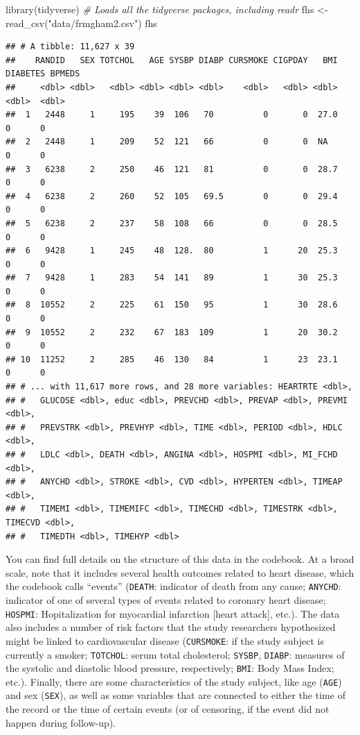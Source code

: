 \documentclass[
]{book}
\newenvironment{Shaded}{\begin{snugshade}}{\end{snugshade}}
\newcommand{\CommentTok}[1]{\textcolor[rgb]{0.56,0.35,0.01}{\textit{#1}}}
\newcommand{\FunctionTok}[1]{\textcolor[rgb]{0.00,0.00,0.00}{#1}}
\newcommand{\NormalTok}[1]{#1}
\newcommand{\OtherTok}[1]{\textcolor[rgb]{0.56,0.35,0.01}{#1}}
\newcommand{\StringTok}[1]{\textcolor[rgb]{0.31,0.60,0.02}{#1}}
\begin{document}
\begin{Shaded}
\begin{Highlighting}[]
\FunctionTok{library}\NormalTok{(tidyverse) }\CommentTok{\# Loads all the tidyverse packages, including readr}
\NormalTok{fhs }\OtherTok{\textless{}{-}} \FunctionTok{read\_csv}\NormalTok{(}\StringTok{"data/frmgham2.csv"}\NormalTok{)}
\NormalTok{fhs}
\end{Highlighting}
\end{Shaded}

\begin{verbatim}
## # A tibble: 11,627 x 39
##    RANDID   SEX TOTCHOL   AGE SYSBP DIABP CURSMOKE CIGPDAY   BMI DIABETES BPMEDS
##     <dbl> <dbl>   <dbl> <dbl> <dbl> <dbl>    <dbl>   <dbl> <dbl>    <dbl>  <dbl>
##  1   2448     1     195    39  106   70          0       0  27.0        0      0
##  2   2448     1     209    52  121   66          0       0  NA          0      0
##  3   6238     2     250    46  121   81          0       0  28.7        0      0
##  4   6238     2     260    52  105   69.5        0       0  29.4        0      0
##  5   6238     2     237    58  108   66          0       0  28.5        0      0
##  6   9428     1     245    48  128.  80          1      20  25.3        0      0
##  7   9428     1     283    54  141   89          1      30  25.3        0      0
##  8  10552     2     225    61  150   95          1      30  28.6        0      0
##  9  10552     2     232    67  183  109          1      20  30.2        0      0
## 10  11252     2     285    46  130   84          1      23  23.1        0      0
## # ... with 11,617 more rows, and 28 more variables: HEARTRTE <dbl>,
## #   GLUCOSE <dbl>, educ <dbl>, PREVCHD <dbl>, PREVAP <dbl>, PREVMI <dbl>,
## #   PREVSTRK <dbl>, PREVHYP <dbl>, TIME <dbl>, PERIOD <dbl>, HDLC <dbl>,
## #   LDLC <dbl>, DEATH <dbl>, ANGINA <dbl>, HOSPMI <dbl>, MI_FCHD <dbl>,
## #   ANYCHD <dbl>, STROKE <dbl>, CVD <dbl>, HYPERTEN <dbl>, TIMEAP <dbl>,
## #   TIMEMI <dbl>, TIMEMIFC <dbl>, TIMECHD <dbl>, TIMESTRK <dbl>, TIMECVD <dbl>,
## #   TIMEDTH <dbl>, TIMEHYP <dbl>
\end{verbatim}

You can find full details on the structure of this data in the codebook. At a broad scale, note that it includes several health outcomes related to heart disease, which the codebook calls ``events'' (\texttt{DEATH}: indicator of death from any cause; \texttt{ANYCHD}: indicator of one of several types of events related to coronary heart disease; \texttt{HOSPMI}: Hopitalization for myocardial infarction {[}heart attack{]}, etc.). The data also includes a number of risk factors that the study researchers hypothesized might be linked to cardiovascular disease (\texttt{CURSMOKE}: if the study subject is currently a smoker; \texttt{TOTCHOL}: serum total cholesterol; \texttt{SYSBP}, \texttt{DIABP}: measures of the systolic and diastolic blood pressure, respectively; \texttt{BMI}: Body Mass Index; etc.). Finally, there are some characteristics of the study subject, like age (\texttt{AGE}) and sex (\texttt{SEX}), as well as some variables that are connected to either the time of the record or the time of certain events (or of censoring, if the event did not happen during follow-up).
\end{document}
